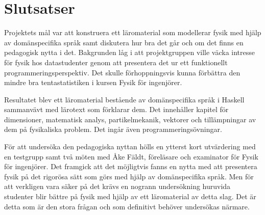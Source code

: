 
\chapter{Slutsatser}

\begin{binge}

Projektets mål var att konstruera ett läromaterial som modellerar fysik med hjälp av domänspecifika språk samt diskutera hur bra det går och om det finns en pedagogisk nytta i det. Bakgrunden låg i att projektgruppen ville väcka intresse för fysik hos datastudenter genom att presentera det ur ett funktionellt programmeringsperspektiv. Det skulle förhoppningsvis kunna förbättra den mindre bra tentastatistiken i kursen Fysik för ingenjörer.

Resultatet blev ett läromaterial bestående av domänspecifika språk i Haskell sammanvävt med lärotext som förklarar dem. Det innehåller kapitel för dimensioner, matematisk analys, partikelmekanik, vektorer och tillämpningar av dem på fysikaliska problem. Det ingår även programmeringsövningar.

För att undersöka den pedagogiska nyttan hölls en ytterst kort utvärdering med en testgrupp samt två möten med Åke Fäldt, föreläsare och examinator för Fysik för ingenjörer. Det framgick att det möjligtvis fanns en nytta med att presentera fysik på det rigorösa sätt som görs med hjälp av domänspecifika språk. Men för att verkligen vara säker på det krävs en nogrann undersökning huruvida studenter blir bättre på fysik med hjälp av ett läromaterial av detta slag. Det är detta som är den stora frågan och som definitivt behöver undersökas närmare.

\end{binge}
